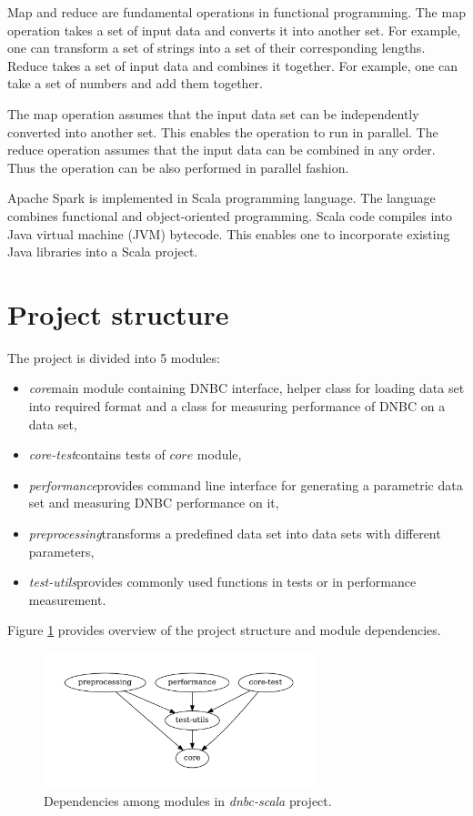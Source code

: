 \documentclass[thesis=B,english]{FITthesis}[2012/06/26]
\begin{document}
Map and reduce are fundamental operations in functional programming. The map operation takes a set of input data and converts it into another set. For example, one can transform a set of strings into a set of their corresponding lengths. Reduce takes a set of input data and combines it together. For example, one can take a set of numbers and add them together.

The map operation assumes that the input data set can be independently converted into another set. This enables the operation to run in parallel. The reduce operation assumes that the input data can be combined in any order. Thus the operation can be also performed in parallel fashion.

Apache Spark is implemented in Scala programming language. The language combines functional and object-oriented programming. Scala code compiles into Java virtual machine (JVM) bytecode. This enables one to incorporate existing Java libraries into a Scala project.

\section{Project structure}

The project is divided into 5 modules:

\begin{itemize}

\item \textit{core}\textemdash main module containing DNBC interface, helper class for loading data set into required format and a class for measuring performance of DNBC on a data set,
\item \textit{core-test}\textemdash contains tests of $core$ module,
\item \textit{performance}\textemdash provides command line interface for generating a parametric data set and measuring DNBC performance on it,
\item \textit{preprocessing}\textemdash transforms a predefined data set into data sets with different parameters,
\item \textit{test-utils}\textemdash provides commonly used functions in tests or in performance measurement.

\end{itemize}

Figure \ref{fig:module-dependencies} provides overview of the project structure and module dependencies.

\begin{figure}
	\centering
 	\includegraphics[width=0.7\textwidth]{module-dependencies}
 	\caption{Dependencies among modules in \textit{dnbc-scala} project.}
 	\label{fig:module-dependencies}
\end{figure}
\end{document}
